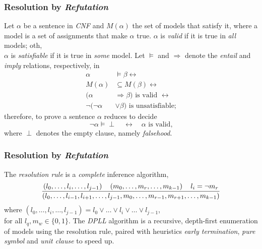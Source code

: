 \documentclass[9pt]{beamer}
\begin{document}
\begin{frame}[fragile]

\frametitle{Resolution by \textit{Refutation}}

Let $\alpha$ be a sentence in \textit{CNF} and $M(\alpha)$ the set of models that
satisfy it, where a model is a set of assignments that make $\alpha$ true.
\vfill
$\alpha$ is \textit{valid} if it is true in \textit{all} models; oth,\\
$\alpha$ is \textit{satisfiable} if it is true in \textit{some} model.
\vfill
Let $\models$ and $\Rightarrow$ denote the \textit{entail} and \textit{imply} relations, respectively, in
\begin{displaymath}
\begin{split}
\alpha &\models \beta \leftrightarrow \\
M(\alpha) &\subseteq M(\beta) \leftrightarrow \\
(\alpha &\Rightarrow \beta) \text{ is valid } \leftrightarrow\\
\neg(\neg\alpha &\vee \beta) \text{ is unsatisfiable;}
\end{split}
\end{displaymath}
therefore, to prove a sentence $\alpha$ reduces to decide
$$\neg\alpha\models\perp\quad\leftrightarrow\quad\alpha\text{ is valid,}$$
where $\perp$ denotes the empty clause, namely \textit{falsehood}.
\end{frame}

\begin{frame}[fragile]
\frametitle{Resolution by \textit{Refutation}}
The \textit{resolution rule} is a \textit{complete} inference algorithm,
\begin{displaymath}
{\left(l_{0}, \ldots, l_{i}, \ldots, l_{j-1}\right) \quad \left(m_{0}, \ldots, m_{r},\ldots, m_{k-1}\right) \quad l_{i} = \neg m_{r}
\over
\left(l_{0},\ldots, l_{i-1},l_{i+1}, \ldots,l_{j-1}, m_{0},\ldots, m_{r-1},m_{r+1},\ldots, m_{k-1}\right)}
\end{displaymath}
where $\left(l_{0},\ldots, l_{i}, \ldots, l_{j-1}\right) = l_{0}\vee \ldots
\vee l_{i} \vee \ldots \vee l_{j-1}$, \\
for all $l_{q}, m_{w} \in\lbrace 0,1\rbrace$.
\vfill
The \textit{DPLL} algorithm is a recursive, depth-first enumeration of models
using the resolution rule, paired with heuristics \textit{early termination},
\textit{pure symbol} and \textit{unit clause} to speed up.
\end{frame}
\end{document}
